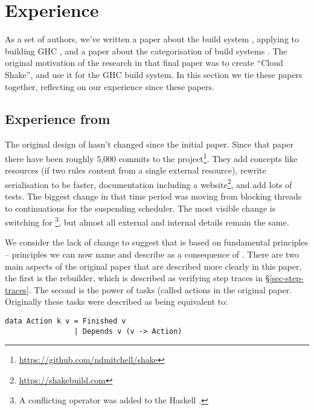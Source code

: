 \section{Experience}\label{sec-experience}

As a set of authors, we've written a paper about the \Shake build system \cite{mitchell2012shake},
applying \Shake to building GHC \cite{hadrian}, and a paper about the categorisation of build
systems \cite{mokhov2018buildsystems}. The original motivation of the research in that final paper was to create
``Cloud Shake'', and use it for the GHC build system. In this section we tie these papers together,
reflecting on our experience since these papers.

\subsection{Experience from \Shake}

The original design of \Shake hasn't changed since the initial paper. Since that paper there have been roughly 5,000 commits to the \Shake project\footnote{\url{https://github.com/ndmitchell/shake}}. They add concepts like resources (if two rules content from a single external resource), rewrite serialisation to be faster, documentation including a website\footnote{\url{https://shakebuild.com}}, and add lots of tests. The biggest change in that time period was moving from blocking threads to continuations for the suspending scheduler. The most visible change is switching \hs{*>} for \hs{\%>}\footnote{A conflicting \hs{*>} operator was added to the Haskell .}, but almost all external and internal details remain the same.

We consider the lack of change to suggest that \Shake is based on fundamental principles -- principles we can now name and describe as a consequence of \cite{mokhov2018buildsystems}. There are two main aspects of the original \Shake paper \cite{mitchell2012shake} that are described more clearly in this paper, the first is the rebuilder, which is described as verifying step traces in \S\ref{sec-step-traces}. The second is the power of \Shake tasks (called actions in the original paper. Originally these tasks were described as being equivalent to:

\begin{verbatim}
data Action k v = Finished v
                | Depends v (v -> Action)
\end{verbatim}

